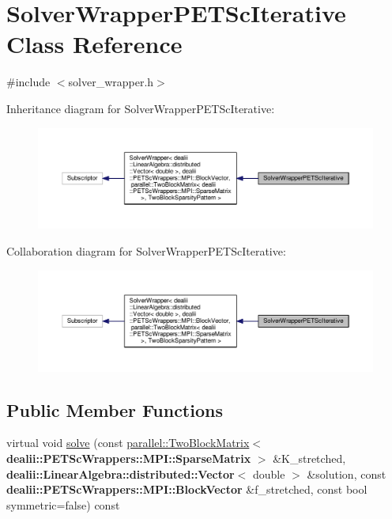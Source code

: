 \hypertarget{class_solver_wrapper_p_e_t_sc_iterative}{}\section{Solver\+Wrapper\+P\+E\+T\+Sc\+Iterative Class Reference}
\label{class_solver_wrapper_p_e_t_sc_iterative}


{\ttfamily \#include $<$solver\+\_\+wrapper.\+h$>$}



Inheritance diagram for Solver\+Wrapper\+P\+E\+T\+Sc\+Iterative\+:
\nopagebreak
\begin{figure}[H]
\begin{center}
\leavevmode
\includegraphics[width=350pt]{class_solver_wrapper_p_e_t_sc_iterative__inherit__graph}
\end{center}
\end{figure}


Collaboration diagram for Solver\+Wrapper\+P\+E\+T\+Sc\+Iterative\+:
\nopagebreak
\begin{figure}[H]
\begin{center}
\leavevmode
\includegraphics[width=350pt]{class_solver_wrapper_p_e_t_sc_iterative__coll__graph}
\end{center}
\end{figure}
\subsection*{Public Member Functions}
\begin{DoxyCompactItemize}
\item 
virtual void \hyperlink{class_solver_wrapper_p_e_t_sc_iterative_a22441581003123bc0ecefde1cf0f121a}{solve} (const \hyperlink{classparallel_1_1_two_block_matrix}{parallel\+::\+Two\+Block\+Matrix}$<$ {\bf dealii\+::\+P\+E\+T\+Sc\+Wrappers\+::\+M\+P\+I\+::\+Sparse\+Matrix} $>$ \&K\+\_\+stretched, {\bf dealii\+::\+Linear\+Algebra\+::distributed\+::\+Vector}$<$ double $>$ \&solution, const {\bf dealii\+::\+P\+E\+T\+Sc\+Wrappers\+::\+M\+P\+I\+::\+Block\+Vector} \&f\+\_\+stretched, const bool symmetric=false) const 
\end{DoxyCompactItemize}


